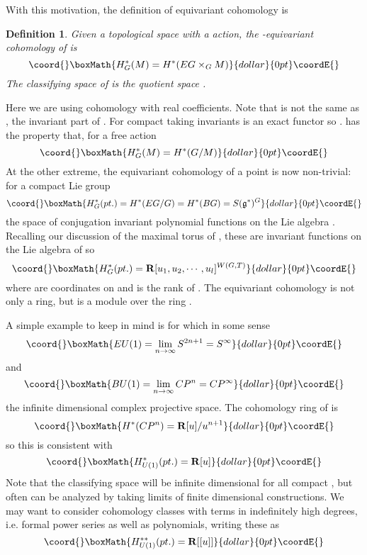 \documentclass[a4paper,a4paper]{article}
\newtheorem{define}{Definition}
\theoremstyle{conjecture}
\begin{document}
With this motivation, the definition of equivariant cohomology is

\begin{define}
Given a topological space \coordHE{} with a \coordHE{} action, the \coordHE{}-equivariant
cohomology of \coordHE{} is
$$\coord{}\boxMath{H^*_G(M)=H^*(EG\times_G M)}{dollar}{0pt}\coordE{}$$
The classifying space \coordHE{} of \coordHE{} is the quotient space \coordHE{}.
\end{define}

Here we are using cohomology with real coefficients.
Note that \coordHE{} is not the same as \coordHE{}, the \coordHE{} invariant part of \coordHE{}.
For \coordHE{} compact taking \coordHE{} invariants is an exact functor so \coordHE{}.  \coordHE{} has the
property that, for a free \coordHE{} action
$$\coord{}\boxMath{H^*_G(M)=H^*(G/M)}{dollar}{0pt}\coordE{}$$
At the other extreme, the equivariant cohomology of a point is now non-trivial: for
a compact Lie group 
$$\coord{}\boxMath{H^*_G(pt.)=H^*(EG/G)=H^*(BG)=S(\mathfrak g^*)^G}{dollar}{0pt}\coordE{}$$
the space of conjugation invariant polynomial functions on the Lie algebra
\coordHE{}.  Recalling our discussion of the maximal torus \coordHE{} of \coordHE{}, these
are \coordHE{} invariant functions on the Lie algebra of \coordHE{} so
$$\coord{}\boxMath{H^*_G(pt.)={\mathbf R}[u_1,u_2,\cdots,u_l]^{W(G,T)}}{dollar}{0pt}\coordE{}$$
where \coordHE{} are coordinates on \coordHE{} and \coordHE{} is the rank of \coordHE{}.  The
equivariant cohomology \coordHE{} is not only a ring, but is a module over the
ring \coordHE{}.

A simple example to keep in mind is \coordHE{} for which in some sense
$$\coord{}\boxMath{EU(1)=\lim_{n\rightarrow\infty}S^{2n+1}=S^\infty}{dollar}{0pt}\coordE{}$$
and 
$$\coord{}\boxMath{BU(1)=\lim_{n\rightarrow\infty}CP^{n}=CP^\infty}{dollar}{0pt}\coordE{}$$
the infinite dimensional complex projective space. The cohomology ring of
\coordHE{} is 
$$\coord{}\boxMath{H^*(CP^n)={\mathbf R}[u]/u^{n+1}}{dollar}{0pt}\coordE{}$$
so this is consistent with
$$\coord{}\boxMath{H^*_{U(1)}(pt.)={\mathbf R}[u]}{dollar}{0pt}\coordE{}$$
Note that the
classifying space \coordHE{} will be infinite dimensional for all compact \coordHE{}, but
often can be analyzed by taking limits of finite dimensional constructions.
We may want to consider cohomology classes with terms in indefinitely high
degrees, i.e. formal power series as well as polynomials, writing these as
$$\coord{}\boxMath{H^{**}_{U(1)}(pt.)={\mathbf R}[[u]]}{dollar}{0pt}\coordE{}$$
\end{document}
